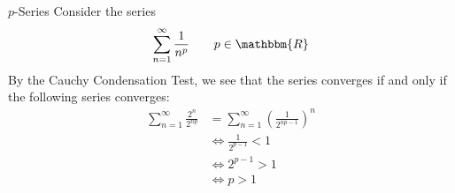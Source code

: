\documentclass[10pt]{extarticle}
\newcommand{\R}{\mathbbm{R}}
\begin{document}
  \begin{problem}{$p$-Series}
    Consider the series
    \begin{align*}
      \sum_{n=1}^{\infty}\frac{1}{n^p} \tag*{$p\in\R$}
    \end{align*}
    By the Cauchy Condensation Test, we see that the series converges if and only if the following series converges:
    \begin{align*}
      \sum_{n=1}^{\infty}\frac{2^n}{2^{np}} &= \sum_{n=1}^{\infty}\left(\frac{1}{2^{np-1}}\right)^n\\
                                            &\Leftrightarrow \frac{1}{2^{p-1}} < 1\\
                                            &\Leftrightarrow 2^{p-1} > 1\\
                                            &\Leftrightarrow p > 1
    \end{align*}
  \end{problem}
\end{document}
